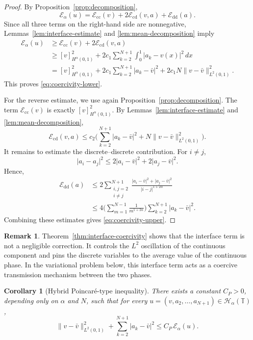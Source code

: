 \documentclass[11pt]{article}
\numberwithin{equation}{section}
\newtheorem{corollary}[theorem]{Corollary}
\theoremstyle{definition}
\newtheorem{remark}[theorem]{Remark}
\newcommand{\T}{\mathbb{T}}
\newcommand{\EE}{\mathcal{E}}
\newcommand{\HH}{\mathcal{H}}
\newcommand{\abs}[1]{\lvert#1\rvert}
\newcommand{\norm}[1]{\lVert#1\rVert}
\newcommand{\cc}{\mathrm{cc}}
\newcommand{\cdt}{\mathrm{cd}}
\newcommand{\dd}{\mathrm{dd}}
\begin{document}
\begin{proof}
By Proposition~\ref{prop:decomposition},
\[
\EE_\alpha(u)=\EE_{\cc}(v)+2\EE_{\cdt}(v,a)+\EE_{\dd}(a).
\]
Since all three terms on the right-hand side are nonnegative, Lemmas~\ref{lem:interface-estimate} and \ref{lem:mean-decomposition} imply
\begin{align*}
\EE_\alpha(u)
&\ge \EE_{\cc}(v)+2\EE_{\cdt}(v,a) \\
&\ge [v]_{H^\alpha(0,1)}^2+2c_1\sum_{k=2}^{N+1}\int_0^1\abs{a_k-v(x)}^2\,dx \\
&= [v]_{H^\alpha(0,1)}^2
+2c_1\sum_{k=2}^{N+1}\abs{a_k-\bar v}^2
+2c_1N\norm{v-\bar v}_{L^2(0,1)}^2.
\end{align*}
This proves \eqref{eq:coercivity-lower}.

For the reverse estimate, we use again Proposition~\ref{prop:decomposition}. The term $\EE_{\cc}(v)$ is exactly $[v]_{H^\alpha(0,1)}^2$. By Lemmas~\ref{lem:interface-estimate} and \ref{lem:mean-decomposition},
\[
\EE_{\cdt}(v,a)
\le c_2\Big(
\sum_{k=2}^{N+1}\abs{a_k-\bar v}^2+N\norm{v-\bar v}_{L^2(0,1)}^2
\Big).
\]
It remains to estimate the discrete--discrete contribution. For $i\neq j$,
\[
\abs{a_i-a_j}^2
\le 2\abs{a_i-\bar v}^2+2\abs{a_j-\bar v}^2.
\]
Hence,
\begin{align*}
\EE_{\dd}(a)
&\le 2\sum_{\substack{i,j=2\\ i\neq j}}^{N+1}
\frac{\abs{a_i-\bar v}^2+\abs{a_j-\bar v}^2}{\abs{i-j}^{1+2\alpha}} \\
&\le 4\Big(\sum_{m=1}^{N-1}\frac{1}{m^{1+2\alpha}}\Big)
\sum_{k=2}^{N+1}\abs{a_k-\bar v}^2.
\end{align*}
Combining these estimates gives \eqref{eq:coercivity-upper}.
\end{proof}

\begin{remark}
Theorem~\ref{thm:interface-coercivity} shows that the interface term is not a negligible correction. It controls the $L^2$ oscillation of the continuous component and pins the discrete variables to the average value of the continuous phase. In the variational problem below, this interface term acts as a coercive transmission mechanism between the two phases.
\end{remark}

\begin{corollary}[Hybrid Poincar\'e-type inequality]\label{cor:hybrid-poincare}
There exists a constant $C_P>0$, depending only on $\alpha$ and $N$, such that for every $u=(v,a_2,\dots,a_{N+1})\in \HH_\alpha(\T)$,
\[
\norm{v-\bar v}_{L^2(0,1)}^2+\sum_{k=2}^{N+1}\abs{a_k-\bar v}^2
\le C_P\,\EE_\alpha(u).
\]
\end{corollary}
\end{document}
